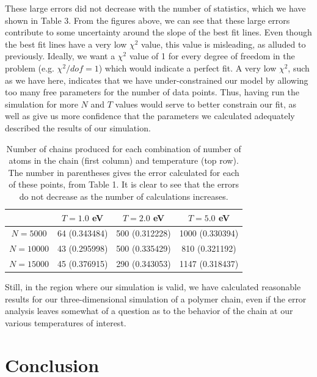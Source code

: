 \documentclass{article}
\begin{document}
\begin{multicols}{2}
These large errors did not decrease with the number of statistics, which we have shown in Table 3.  From the figures above, we can see that these large errors contribute to some uncertainty around the slope of the best fit lines.  Even though the best fit lines have a very low $\chi ^2$ value, this value is misleading, as alluded to previously.  Ideally, we want a $\chi^2$ value of 1 for every degree of freedom in the problem (e.g. $\chi ^2/dof =1$) which would indicate a perfect fit.  A very low $\chi ^2$, such as we have here, indicates that we have under-constrained our model by allowing too many free parameters for the number of data points. Thus, having run the simulation for more $N$ and $T$ values would serve to better constrain our fit, as well as give us more confidence that the parameters we calculated adequately described the results of our simulation.  \\

\begin{table}
\begin{center}
\begin{tabular}{| c | c | c | c |}
\hline & $T=1.0$ eV & $T = 2.0$ eV & $T = 5.0$ eV \\ \hline
$N=5000$ & 64 (0.343484) & 500 (0.312228) & 1000 (0.330394) \\ \hline
$N=10000$ & 43 (0.295998)  & 500 (0.335429) & 810 (0.321192) \\ \hline
$N=15000$ & 45 (0.376915) & 290 (0.343053) & 1147 (0.318437) \\ \hline
\end{tabular}
\caption{Number of chains produced for each combination of number of atoms in the chain (first column) and temperature (top row).  The number in parentheses gives the error calculated for each of these points, from Table 1.  It is clear to see that the errors do not decrease as the number of calculations increases.}
\end{center}
\end{table}

Still, in the region where our simulation is valid, we have calculated reasonable results for our three-dimensional simulation of a polymer chain, even if the error analysis leaves somewhat of a question as to the behavior of the chain at our various temperatures of interest.   \\

\section{Conclusion}
\label{concl}


\end{multicols}
\end{document}
